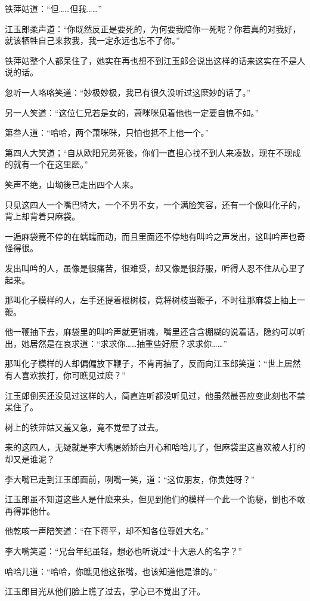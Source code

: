 \documentclass[12pt,oneside]{book}
\begin{document}
铁萍姑道：``但\ldots\ldots 但我\ldots\ldots{}''

江玉郎柔声道：``你既然反正是要死的，为何要我陪你一死呢？你若真的对我好，就该牺牲自己来救我，我一定永远也忘不了你。''

铁萍姑整个人都呆住了，她实在再也想不到江玉郎会说出这样的话来这实在不是人说的话。

忽听一人咯咯笑道：``妙极妙极，我已有很久没听过这麽妙的话了。''

另一人笑道：``这位仁兄若是女的，萧咪咪见着他也一定要自愧不如。''

第叁人道：``哈哈，两个萧咪咪，只怕也抵不上他一个。''

第四人大笑道；``自从欧阳兄弟死後，你们一直担心找不到人来凑数，现在不现成的就有一个在这里麽。''

笑声不绝，山坳後已走出四个人来。

只见这四人一个嘴巴特大，一个不男不女，一个满脸笑容，还有一个像叫化子的，背上却背着只麻袋。

一逅麻袋竟不停的在蠕蠕而动，而且里面还不停地有叫吟之声发出，这叫吟声也奇怪得很。

发出叫吟的人，虽像是很痛苦，很难受，却又像是很舒服，听得人忍不住从心里了起来。

那叫化子模样的人，左手还提着根树枝，竟将树枝当鞭子，不时往那麻袋上抽上一鞭。

他一鞭抽下去，麻袋里的叫吟声就更销魂，嘴里还含含棚糊的说着话，隐约可以听出，她居然是在哀求道：``求求你\ldots\ldots 抽重些好麽？求求你\ldots\ldots{}''

那叫化子模样的人却偏偏放下鞭子，不肯再抽了，反而向江玉郎笑道：``世上居然有人喜欢挨打，你可瞧见过麽？''

江玉郎倒买还没见过这样的人，简直连听都没听见过，他虽然最善应变此刻也不禁呆住了。

树上的铁萍姑又羞又急，竟不觉晕了过去。

来的这四人，无疑就是李大嘴屠娇娇白开心和哈哈儿了，但麻袋里这喜欢被人打的却又是谁泥？

李大嘴已走到江玉郎面前，咧嘴一笑，道：``这位朋友，你贵姓呀？''

江玉郎虽不知道这些人是什麽来头，但见到他们的模样一个此一个诡秘，倒也不敢再得罪他什。

他乾咳一声陪笑道：``在下蒋平，却不知各位尊姓大名。''

李大嘴笑道：``兄台年纪虽轻，想必也听说过``十大恶人的名字？''

哈哈儿道：``哈哈，你瞧见他这张嘴，也该知道他是谁的。''

江玉郎目光从他们脸上瞧了过去，掌心已不觉出了汗。
\end{document}
